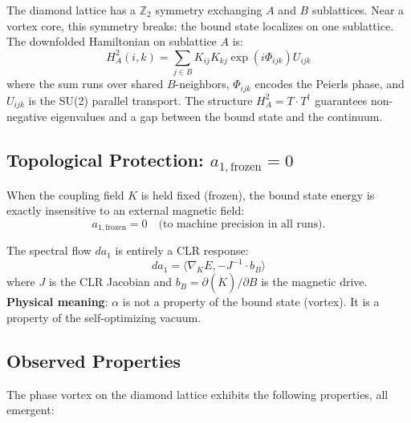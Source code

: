 \documentclass[aps,prd,onecolumn,superscriptaddress,floatfix,12pt]{revtex4-2}
\begin{document}
The diamond lattice has a $\mathbb{Z}_2$ symmetry exchanging $A$ and $B$ sublattices. Near a vortex core, this symmetry breaks: the bound state localizes on one sublattice. The downfolded Hamiltonian on sublattice $A$ is:
\begin{equation}\label{eq:downfold}
H^2_A(i, k) = \sum_{j \in B} K_{ij} K_{kj} \exp(i\Phi_{ijk}) U_{ijk}
\end{equation}
where the sum runs over shared $B$-neighbors, $\Phi_{ijk}$ encodes the Peierls phase, and $U_{ijk}$ is the SU(2) parallel transport. The structure $H^2_A = T \cdot T^\dagger$ guarantees non-negative eigenvalues and a gap between the bound state and the continuum.

\subsection{Topological Protection: $a_{1,\text{frozen}} = 0$}\label{sec:4-3}

When the coupling field $K$ is held fixed (frozen), the bound state energy is exactly insensitive to an external magnetic field:
\begin{equation}
a_{1,\text{frozen}} = 0 \quad \text{(to machine precision in all runs)}.
\end{equation}

The spectral flow $da_1$ is entirely a CLR response:
\begin{equation}\label{eq:spectral-flow}
da_1 = \langle\nabla_K E, -J^{-1} \cdot b_B\rangle
\end{equation}
where $J$ is the CLR Jacobian and $b_B = \partial(\dot{K})/\partial B$ is the magnetic drive. \textbf{Physical meaning}: $\alpha$ is not a property of the bound state (vortex). It is a property of the self-optimizing vacuum.

\subsection{Observed Properties}\label{sec:4-4}

The phase vortex on the diamond lattice exhibits the following properties, all emergent:
\end{document}
